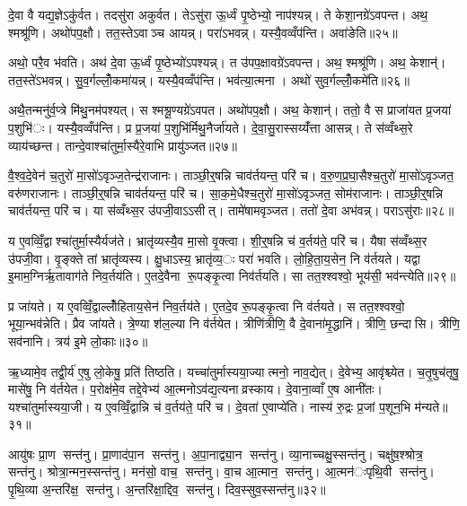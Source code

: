 
दे॒वा वै यद्य॒ज्ञेऽकु॑र्वत। तदसु॑रा अकुर्वत। तेऽसु॑रा ऊ॒र्ध्वं पृ॒ष्ठेभ्यो॒ नाप॑श्यन्न्। ते केशा॒नग्रे॑ऽवपन्त। अथ॒ श्मश्रू॑णि। अथो॑पप॒क्षौ। तत॒स्तेऽवाञ्च आयन्न्। परा॑ऽभवन्न्। यस्यै॒वव्वँप॑न्ति। अवा॑ङेति॥२५॥

अथो॒ परै॒व भ॑वति। अथ॑ दे॒वा ऊ॒र्ध्वं पृ॒ष्ठेभ्यो॑ऽपश्यन्न्। त उ॑पप॒क्षावग्रे॑ऽवपन्त। अथ॒ श्मश्रू॑णि। अथ॒ केशान्॑। तत॒स्ते॑ऽभवन्न्। सु॒व॒र्गल्लोँ॒कमा॑यन्न्। यस्यै॒वव्वँप॑न्ति। भव॑त्या॒त्मना। अथो॑ सुव॒र्गल्लोँ॒कमे॑ति॥२६॥

अथै॒तन्मनु॑र्व॒प्त्रे मि॑थु॒नम॑पश्यत्। स श्मश्रू॒ण्यग्रे॑ऽवपत। अथो॑पप॒क्षौ। अथ॒ केशान्॑। ततो॒ वै स प्राजा॑यत प्र॒जया॑ प॒शुभि॑ः। यस्यै॒वव्वँप॑न्ति। प्र प्र॒जया॑ प॒शुभि॑र्मिथु॒नैर्जा॑यते। दे॒वा॒सु॒रास्सय्यँ॑त्ता आसन्न्। ते स॑व्वँथ्स॒रे व्याय॑च्छन्त। तान्दे॒वाश्चा॑तुर्मा॒स्यैरे॒वाभि प्रायु॑ञ्जत॥२७॥

वै॒श्व॒दे॒वेन॑ च॒तुरो॑ मा॒सो॑ऽवृञ्ज॒तेन्द्र॑राजानः। ताञ्छी॒र्॒षन्नि चाव॑र्तयन्त॒ परि॑ च। व॒रु॒ण॒प्र॒घा॒सैश्च॒तुरो॑ मा॒सो॑ऽवृञ्जत॒ वरु॑णराजानः। ताञ्छी॒र्॒षन्नि चाव॑र्तयन्त॒ परि॑ च। सा॒क॒मे॒धैश्च॒तुरो॑ मा॒सो॑ऽवृञ्जत॒ सोम॑राजानः। ताञ्छी॒र्॒षन्नि चाव॑र्तयन्त॒ परि॑ च। या स॑व्वँथ्स॒र उ॑पजी॒वाऽऽसीत्। तामे॑षामवृञ्जत। ततो॑ दे॒वा अभ॑वन्न्। पराऽसु॑राः॥२८॥

य ए॒वव्विँ॒द्वाश्चा॑तुर्मा॒स्यैर्यज॑ते। भ्रातृ॑व्यस्यै॒व मा॒सो वृ॒क्त्वा। शी॒र्॒षन्नि च॑ व॒र्तय॑ते॒ परि॑ च। यैषा स॑व्वँथ्स॒र उ॑पजी॒वा। वृ॒ङ्क्ते तां भ्रातृ॑व्यस्य। क्षु॒धाऽस्य॒ भ्रातृ॑व्य॒ः परा॑ भवति। लो॒हि॒ता॒य॒सेन॒ नि व॑र्तयते। यद्वा इ॒माम॒ग्निर्ऋ॒तावाग॑ते निव॒र्तय॑ति। ए॒तदे॒वैना रू॒पङ्कृ॒त्वा निव॑र्तयति। सा तत॒श्श्वश्वो॒ भूय॑सी॒ भव॑न्त्येति॥२९॥

प्र जा॑यते। य ए॒वव्विँ॒द्वाल्लोँ॑हिताय॒सेन॑ निव॒र्तय॑ते। ए॒तदे॒व रू॒पङ्कृ॒त्वा नि व॑र्तयते। स तत॒श्श्वश्वो॒ भूया॒न्भव॑न्नेति। प्रैव जा॑यते। त्रे॒ण्या श॑ल॒ल्या नि व॑र्तयेत। त्रीणि॑त्रीणि॒ वै दे॒वाना॑मृ॒द्धानि॑। त्रीणि॒ छन्दासि। त्रीणि॒ सव॑नानि। त्रय॑ इ॒मे लो॒काः॥३०॥

ऋ॒ध्यामे॒व तद्वी॒र्य॑ ए॒षु लो॒केषु॒ प्रति॑ तिष्ठति। यच्चा॑तुर्मास्यया॒ज्यात्मनो॒ नाव॒द्येत्। दे॒वेभ्य॒ आवृ॑श्च्येत। च॒तृ॒षुच॑तृषु॒ मासे॑षु॒ नि व॑र्तयेत। प॒रोक्ष॑मे॒व तद्दे॒वेभ्य॑ आ॒त्मनोऽव॑द्य॒त्यनाव्रस्काय। दे॒वाना॒व्वाँ ए॒ष आनी॑तः। यश्चा॑तुर्मास्यया॒जी। य ए॒वव्विँ॒द्वान्नि च॑ व॒र्तय॑ते॒ परि॑ च। दे॒वता॑ ए॒वाप्ये॑ति। नास्य॑ रु॒द्रः प्र॒जां प॒शून॒भि म॑न्यते॥३१॥


आयु॑षः प्रा॒ण सन्त॑नु। प्रा॒णाद॑पा॒न सन्त॑नु। अ॒पा॒नाद्व्या॒न सन्त॑नु। व्या॒नाच्चक्षु॒स्सन्त॑नु। चक्षु॑ष॒श्श्रोत्र॒ सन्त॑नु। श्रोत्रा॒न्मन॒स्सन्त॑नु। मन॑सो॒ वाच॒ सन्त॑नु। वा॒च आ॒त्मान॒ सन्त॑नु। आ॒त्मन॑ःपृथि॒वी सन्त॑नु। पृ॒थि॒व्या अ॒न्तरि॑क्ष॒ सन्त॑नु। अ॒न्तरि॑क्षा॒द्दिव॒ सन्त॑नु। दिव॒स्सुव॒स्सन्त॑नु॥३२॥

